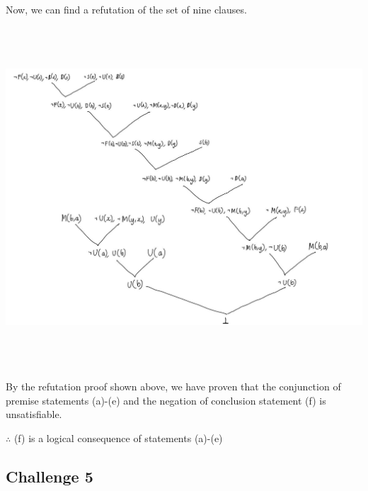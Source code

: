 \documentclass[12pt]{article}
\begin{document}
\bigskip
\noindent
Now, we can find a refutation of the set of nine clauses.

\begin{center}
\includegraphics[width=6in,height=5in,keepaspectratio]{q4_refutation.jpg}
\end{center}


\bigskip
\noindent
By the refutation proof shown above, we have proven that the conjunction of
premise statements (a)-(e) and the negation of conclusion statement (f) is
unsatisfiable. 

\bigskip
\noindent
$\therefore$ (f) is a logical consequence of statements (a)-(e)



\subsection*{Challenge 5}
\end{document}
